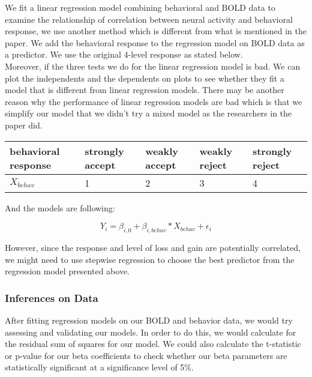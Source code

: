 We fit a linear regression model combining behavioral and BOLD data to examine 
the relationship of correlation between neural activity and behavioral 
response, we use another method which is different from what is mentioned in 
the paper. We add the behavioral response to the regression model on BOLD data 
as a predictor. We use the original 4-level response as stated below. \\ 

Moreover, if the three tests we do for the linear regression model is bad. We 
can plot the independents and the dependents on plots to see whether they fit a 
model that is different from linear regression models. There may be another 
reason why the performance of linear regression models are bad which is that we 
simplify our model that we didn’t try a mixed model as the researchers in the 
paper did.

\begin{tabular}{lllll}
\hline
behavioral response & strongly accept & weakly accept & weakly reject & 
strongly reject\\ 
\hline
$X_{behav}$ & 1 & 2 & 3 & 4 \\
\hline
\end{tabular}

And the models are following:

\begin{equation}
Y_{i} = \beta_{i, 0} + \beta_{i, behav} * X_{behav} + \epsilon_i
\end{equation}

However, since the response and level of loss and gain are potentially 
correlated, we might need to use stepwise regression to choose the best 
predictor from the regression model presented above.

\subsubsection{Inferences on Data}
\indent \indent After fitting regression models on our BOLD and behavior data, 
we would try assessing and validating our models. In order to do this, we would 
calculate for the residual sum of squares for our model. We could also 
calculate the t-statistic or p-value for our beta coefficients to check whether 
our beta parameters are statistically significant at a significance level of 
5\%.
